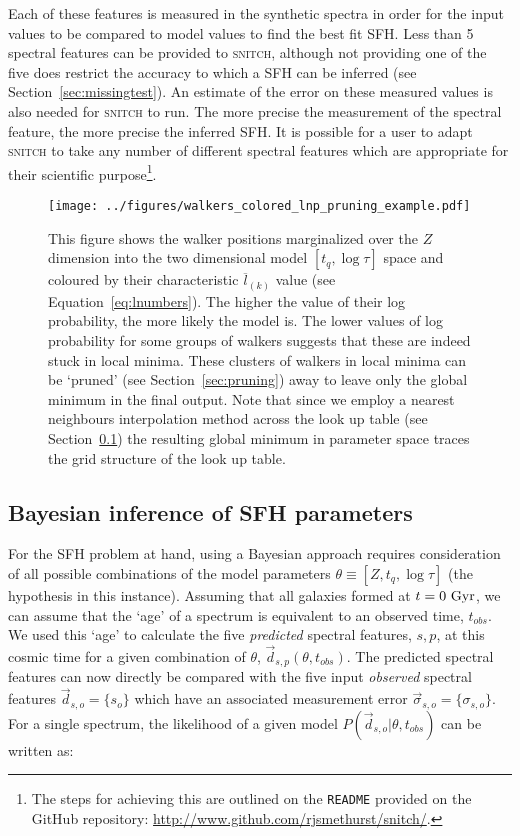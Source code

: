 \documentclass[useAMS,usenatbib]{mn2e}
\begin{document}
Each of these features is measured in the synthetic spectra in order for the input values to be compared to model values to find the best fit SFH. Less than 5 spectral features can be provided to \textsc{snitch}, although not providing one of the five does restrict the accuracy to which a SFH can be inferred (see Section~\ref{sec:missingtest}). An estimate of the error on these measured values is also needed for \textsc{snitch} to run. The more precise the measurement of the spectral feature, the more precise the inferred SFH. It is possible for a user to adapt \textsc{snitch} to take any number of different spectral features which are appropriate for their scientific purpose\footnote{The steps for achieving this are outlined on the \texttt{README} provided on the GitHub repository: \url{http://www.github.com/rjsmethurst/snitch/}.}.

\begin{figure}
\centering
\texttt{[image: ../figures/walkers\_colored\_lnp\_pruning\_example.pdf]}
\caption{This figure shows the walker positions marginalized over the $Z$ dimension into the two dimensional model $[t_q, \log\tau]$ space and coloured by their characteristic $\overline{l}_{(k)}$ value (see Equation~\ref{eq:lnumbers}). The higher the value of their log probability, the more likely the model is. The lower values of log probability for some groups of walkers suggests that these are indeed stuck in local minima. These clusters of walkers in local minima can be `pruned' (see Section~\ref{sec:pruning}) away to leave only the global minimum in the final output. Note that since we employ a nearest neighbours interpolation method across the look up table (see Section~\ref{sec:emcee}) the resulting global minimum in parameter space traces the grid structure of the look up table.}
\label{fig:localminima}
\end{figure}


\subsection{Bayesian inference of SFH parameters}\label{sec:emcee}

For the SFH problem at hand, using a Bayesian approach requires consideration of all possible combinations of the model parameters $\theta \equiv [Z, t_{q}, \log \tau]$ (the hypothesis in this instance). Assuming that all galaxies formed at $t=0~\rm{Gyr}$, we can assume that the `age' of a spectrum is equivalent to an observed time, $t_{obs}$. We used this  `age' to calculate the five \emph{predicted} spectral features, $s,p$, at this cosmic time for a given combination of $\theta$, $\vec{d}_{s,p}(\theta, t_{obs})$. The predicted spectral features can now directly be compared with the five input \emph{observed} spectral features $\vec{d}_{s, o} = \{s_o\}$ which have an associated measurement error $\vec{\sigma}_{s, o} = \{\sigma_{s, o}\}$. For a single spectrum, the likelihood of a given model $P(\vec{d}_{s, o}|\theta, t_{obs})$ can be written as:
\end{document}
